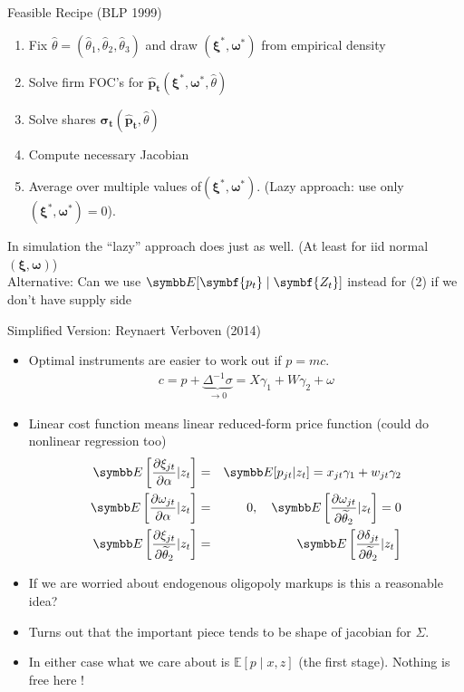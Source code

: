 \documentclass[aspectratio=169,10pt]{beamer}
\begin{document}
\begin{frame}{Feasible Recipe (BLP 1999)}
\begin{enumerate}
\item Fix $\widehat{\theta}=(\widehat{\theta}_1,\widehat{\theta}_2,\widehat{\theta}_3)$ and draw $(\symbf{\xi}^{*},\symbf{\omega}^{*})$ from empirical density
\item Solve firm FOC's for $\symbf{\hat{p}_{t}}(\symbf{\xi}^{*},\symbf{\omega}^{*},\widehat{\theta})$
\item Solve shares $\symbf{\sigma_{t}}(\symbf{\hat{p}_{t}},\widehat{\theta})$
\item Compute necessary Jacobian
\item Average over multiple values of$(\symbf{\xi}^{*},\symbf{\omega}^{*})$. (Lazy approach: use only $(\symbf{\xi}^{*},\symbf{\omega}^{*})=0$).
\end{enumerate}
In simulation the ``lazy'' approach does just as well. (At least for iid normal $(\symbf{\xi},\symbf{\omega})$)\\

 Alternative: Can we use $\E[ \symbf{p_t} \mid \symbf{Z_t}]$ instead for (2) if we don't have supply side
\end{frame}



\begin{frame}{Simplified Version: Reynaert Verboven (2014)}
\begin{itemize}
\footnotesize
\item Optimal instruments are easier to work out if $p = mc$.
\begin{eqnarray*}
c = p  + \underbrace{\Delta^{-1} \sigma}_{\rightarrow 0}  = X \gamma_1 + W \gamma_2 + \omega
\end{eqnarray*}
\item Linear cost function means linear reduced-form price function (could do nonlinear regression too)
\begin{eqnarray*}
\E\left[ \frac{\partial \xi_{jt} }{\partial \alpha} | z_t \right] &=& \E[p_{jt} | z_t] = x_{jt} \gamma_1 + w_{jt} \gamma_2\\
\E\left[ \frac{\partial \omega_{jt} }{\partial \alpha} | z_t \right] &=& 0 , \quad \E\left[ \frac{\partial \omega_{jt} }{\partial \widetilde{\theta}_2} | z_t \right] = 0\\
\E\left[ \frac{\partial \xi_{jt} }{\partial \widetilde{\theta}_2} | z_t \right] &=&\E\left[ \frac{\partial \delta_{jt} }{\partial \widetilde{\theta}_2} | z_t \right]\\
\end{eqnarray*}
\item If we are worried about endogenous oligopoly markups is this a reasonable idea?
\item Turns out that the important piece tends to be \alert{shape} of jacobian for $\Sigma$.
\item In either case what we care about is $\mathbb{E}[p \mid x, z]$ (the \alert{first stage}). Nothing is free here !
\end{itemize}
\end{frame}
\end{document}
